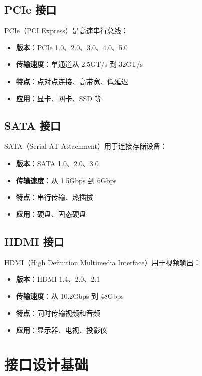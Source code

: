 \documentclass[12pt,UTF8]{ctexbook}
\begin{document}
\section{PCIe 接口}

PCIe（PCI Express）是高速串行总线：

\begin{itemize}[leftmargin=2cm]
    \item \textbf{版本}：PCIe 1.0、2.0、3.0、4.0、5.0
    \item \textbf{传输速度}：单通道从 2.5GT/s 到 32GT/s
    \item \textbf{特点}：点对点连接、高带宽、低延迟
    \item \textbf{应用}：显卡、网卡、SSD 等
\end{itemize}

\section{SATA 接口}

SATA（Serial AT Attachment）用于连接存储设备：

\begin{itemize}[leftmargin=2cm]
    \item \textbf{版本}：SATA 1.0、2.0、3.0
    \item \textbf{传输速度}：从 1.5Gbps 到 6Gbps
    \item \textbf{特点}：串行传输、热插拔
    \item \textbf{应用}：硬盘、固态硬盘
\end{itemize}

\section{HDMI 接口}

HDMI（High Definition Multimedia Interface）用于视频输出：

\begin{itemize}[leftmargin=2cm]
    \item \textbf{版本}：HDMI 1.4、2.0、2.1
    \item \textbf{传输速度}：从 10.2Gbps 到 48Gbps
    \item \textbf{特点}：同时传输视频和音频
    \item \textbf{应用}：显示器、电视、投影仪
\end{itemize}

\chapter{接口设计基础}
\label{chap:interface_design}
\end{document}
